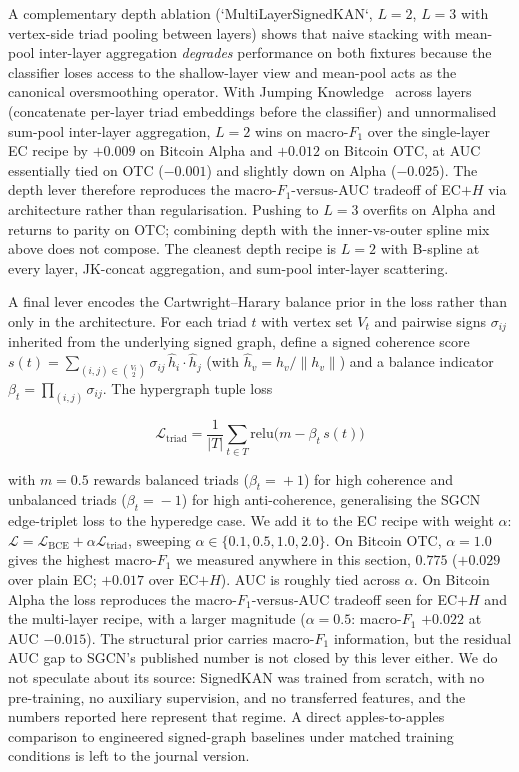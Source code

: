A complementary depth ablation (`MultiLayerSignedKAN`, $L=2$, $L=3$
with vertex-side triad pooling between layers) shows that naive
stacking with mean-pool inter-layer aggregation \emph{degrades}
performance on both fixtures because the classifier loses access to
the shallow-layer view and mean-pool acts as the canonical
oversmoothing operator. With Jumping Knowledge~\cite{xu2018jk}
across layers (concatenate per-layer triad embeddings before the
classifier) and unnormalised sum-pool inter-layer aggregation,
$L\!=\!2$ wins on macro-$F_1$ over the single-layer EC recipe by
$+0.009$ on Bitcoin Alpha and $+0.012$ on Bitcoin OTC, at AUC
essentially tied on OTC ($-0.001$) and slightly down on Alpha
($-0.025$). The depth lever therefore reproduces the
macro-$F_1$-versus-AUC tradeoff of EC$+H$ via architecture rather
than regularisation. Pushing to $L\!=\!3$ overfits on Alpha and
returns to parity on OTC; combining depth with the inner-vs-outer
spline mix above does not compose. The cleanest depth recipe is
$L\!=\!2$ with B-spline at every layer, JK-concat aggregation, and
sum-pool inter-layer scattering.

A final lever encodes the Cartwright--Harary balance prior in the
loss rather than only in the architecture. For each triad $t$ with
vertex set $V_t$ and pairwise signs $\sigma_{ij}$ inherited from
the underlying signed graph, define a signed coherence score
$s(t) = \sum_{(i,j) \in \binom{V_t}{2}} \sigma_{ij}\, \hat h_i \cdot
\hat h_j$ (with $\hat h_v = h_v / \|h_v\|$) and a balance indicator
$\beta_t = \prod_{(i,j)} \sigma_{ij}$. The hypergraph tuple loss

\begin{equation}
\mathcal{L}_{\mathrm{triad}} =
\frac{1}{|T|}\sum_{t \in T} \mathrm{relu}\bigl(m - \beta_t \, s(t)\bigr)
\end{equation}

with $m\!=\!0.5$ rewards balanced triads ($\beta_t\!=\!+1$) for
high coherence and unbalanced triads ($\beta_t\!=\!-1$) for high
anti-coherence, generalising the SGCN edge-triplet loss to the
hyperedge case. We add it to the EC recipe with weight $\alpha$:
$\mathcal{L} = \mathcal{L}_{\mathrm{BCE}} + \alpha
\mathcal{L}_{\mathrm{triad}}$, sweeping
$\alpha \in \{0.1, 0.5, 1.0, 2.0\}$. On Bitcoin OTC,
$\alpha\!=\!1.0$ gives the highest macro-$F_1$ we measured anywhere
in this section, $0.775$ ($+0.029$ over plain EC; $+0.017$ over
EC$+H$). AUC is roughly tied across $\alpha$. On Bitcoin Alpha the
loss reproduces the macro-$F_1$-versus-AUC tradeoff seen for EC$+H$
and the multi-layer recipe, with a larger magnitude
($\alpha\!=\!0.5$: macro-$F_1$ $+0.022$ at AUC $-0.015$). The
structural prior carries macro-$F_1$ information, but the residual
AUC gap to SGCN's published number is not closed by this lever
either. We do not speculate about its source: SignedKAN was trained
from scratch, with no pre-training, no auxiliary supervision, and
no transferred features, and the numbers reported here represent
that regime. A direct apples-to-apples comparison to engineered
signed-graph baselines under matched training conditions is left
to the journal version.

